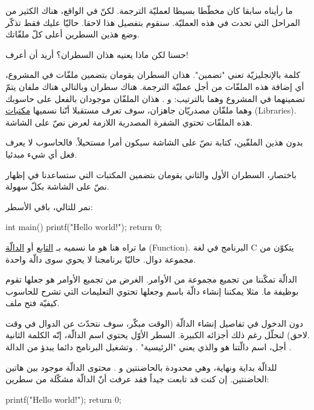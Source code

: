 ما رأيناه سابقا كان مخطّطا بسيطا لعمليّة الترجمة. لكنّ في الواقع، هناك الكثير من المراحل التي تحدث في هذه العمليّة. سنقوم بتفصيل هذا لاحقا. حاليّا عليك فقط تذكّر وضع هذين السطرين أعلى كلّ ملفّاتك.

\begin{question}
  حسنا لكن ماذا يعنيه هذان السطران؟ أريد أن أعرف!
\end{question}

كلمة
 بالإنجليزيّة تعني "تضمين". هذان السطران يقومان بتضمين ملفّات في المشروع، أي إضافة هذه الملفّات من أجل عمليّة الترجمة. هناك سطران وبالتالي هناك ملفان يتمّ تضمينهما في المشروع وهما بالترتيب:
 و
.
هذان الملفّان موجودان بالفعل على حاسوبك وهما ملفّان مصدريّان جاهزان، سوف تعرف مستقبلا أنّنا نسميها
\underline{مكتبات}
(\textenglish{Libraries}).
 هذه الملفّات تحتوي الشفرة المصدرية اللازمة لعرض نصّ على الشاشة.

 بدون هذين الملفّين، كتابة نصّ على الشاشة سيكون أمرا مستحيلاً. فالحاسوب لا يعرف فعل أي شيء مبدئيا.

 باختصار، السطران الأول والثاني يقومان بتضمين المكتبات التي ستساعدنا في إظهار نصّ على الشاشة بكلّ سهولة.

 نمر للتالي، باقي الأسطر:
\begin{Csource}
int main()
{
    printf("Hello world!\n");
    return 0;
}
\end{Csource}

ما تراه هنا هو ما نسميه بـ
\underline{التابع}
أو
\underline{الدالّة}
(\textenglish{Function}).
 البرنامج في لغة
\textenglish{C}
 يتكوّن من مجموعة دوال. حاليّا برنامجنا لا يحوي سوى دالّة واحدة.

الدالّة تمكّننا من تجميع مجموعة من الأوامر. الغرض من تجميع الأوامر هو جعلها تقوم بوظيفة ما. مثلا يمكننا إنشاء دالّة باسم
 وجعلها تحتوي التعليمات التي تشرح للحاسوب كيفيّة فتح ملف.

 دون الدخول في تفاصيل إنشاء الدالّة (الوقت مبكّر، سوف نتحدّث عن الدوال في وقت لاحق) لنحلّل رغم ذلك أجزائه الكبيرة. السطر الأوّل يحتوي اسم الدالّة، إنّه الكلمة الثانية.\\
 أجل، اسم دالّتنا هو
والذي يعني
"الرئيسية"
. وتشغيل البرنامج دائما يبدؤ من الدالة
.

للدالّة بداية ونهاية، وهي محدودة بالحاضنتين
\InlineCode{\{}
و
\InlineCode{\}}
. محتوى الدالّة موجود بين هاتين الحاضنتين. إن كنت قد تابعت جيداً فقد عرفت أنّ الدالّة مشكّلة من سطرين:

\begin{Csource}
printf("Hello world!\n");
return 0;
\end{Csource}

